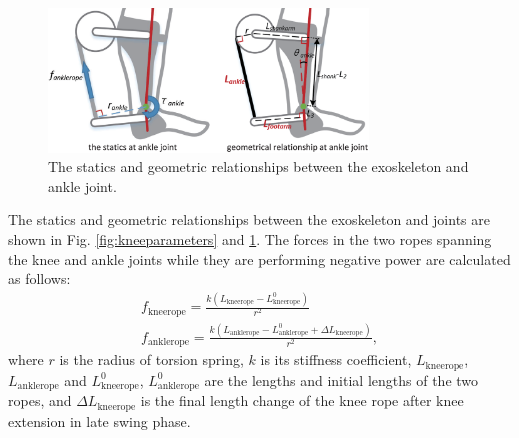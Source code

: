 \documentclass[twocolumn,cleanfoot,10pt]{asme2ej}
\begin{document}
\begin{figure}[t]
	\centering
	\includegraphics[width=8.5cm]{ankleparameters.eps}
	\caption{The statics and geometric relationships between the exoskeleton and ankle joint.}
	\label{fig:ankleparameters}
\end{figure}


The statics and geometric relationships between the exoskeleton and joints are shown in Fig. \ref{fig:kneeparameters} and \ref{fig:ankleparameters}.
The forces in the two ropes spanning the knee and ankle joints while they are performing negative power are calculated as follows:
\begin{gather}
	f_\mathrm{kneerope} = \frac{k(L_\mathrm{kneerope}-L_\mathrm{kneerope}^0)}{r^2} \\
	f_\mathrm{anklerope} = \frac{k(L_\mathrm{anklerope}-L_\mathrm{anklerope}^0+\Delta L_\mathrm{kneerope})}{r^2},
\end{gather}
where $r$ is the radius of torsion spring, $k$ is its stiffness coefficient, $L_\mathrm{kneerope}$, $L_\mathrm{anklerope}$ and $L_\mathrm{kneerope}^0$, $L_\mathrm{anklerope}^0$ are the lengths and initial lengths of the two ropes, and $\Delta L_\mathrm{kneerope}$ is the final length change of the knee rope after knee extension in late swing phase.
\end{document}

